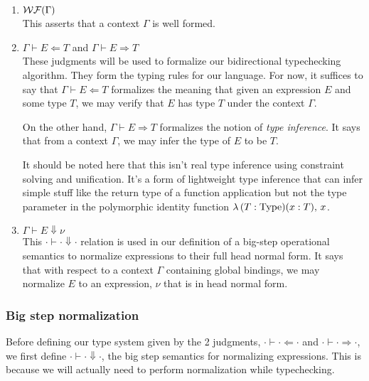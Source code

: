 \documentclass{article}
\begin{document}
\begin{enumerate}
\item $\operatorname{\mathcal{WF}}(\Gamma)$ \\
  This asserts that a context $\Gamma$ is well formed.

\item $\Gamma \vdash E \Leftarrow T$ and $\Gamma \vdash E \Rightarrow T$ \\
  These judgments will be used to formalize our bidirectional typechecking
  algorithm. They form the typing rules for our language.
  For now, it suffices to say that $\Gamma \vdash E \Leftarrow T$ formalizes the
  meaning that given an expression $E$ and some type $T$, we may verify that
  $E$ has type $T$ under the context $\Gamma$.

  On the other hand, $\Gamma \vdash E \Rightarrow T$ formalizes the notion of
  \textit{type inference}. It says that from a context $\Gamma$, we may infer
  the type of $E$ to be $T$. 
  
  It should be noted here that this isn't real type
  inference using constraint solving and unification. It's a form of lightweight
  type inference that can infer simple stuff like the return type of a function
  application but not the type parameter in the polymorphic identity function
  $\lambda \, (T : \operatorname{Type}) (x : T), \, x$.

\item $\Gamma \vdash E \Downarrow \nu$ \\
  This $\cdot \vdash \cdot \Downarrow \cdot$ relation is used in our definition of a
  big-step operational semantics to normalize expressions to their full head
  normal form.
  It says that with respect to a context $\Gamma$ containing global bindings, we
  may normalize $E$ to an expression, $\nu$ that is in head normal form.
\end{enumerate}

\subsubsection{Big step normalization}
Before defining our type system given by the 2 judgments,
$\cdot \vdash \cdot \Leftarrow \cdot$ and $\cdot \vdash \cdot \Rightarrow
\cdot$, we first define $\cdot \vdash \cdot \Downarrow \cdot$, the big
step semantics for normalizing expressions. This is because we will actually
need to perform normalization while typechecking.
\end{document}
